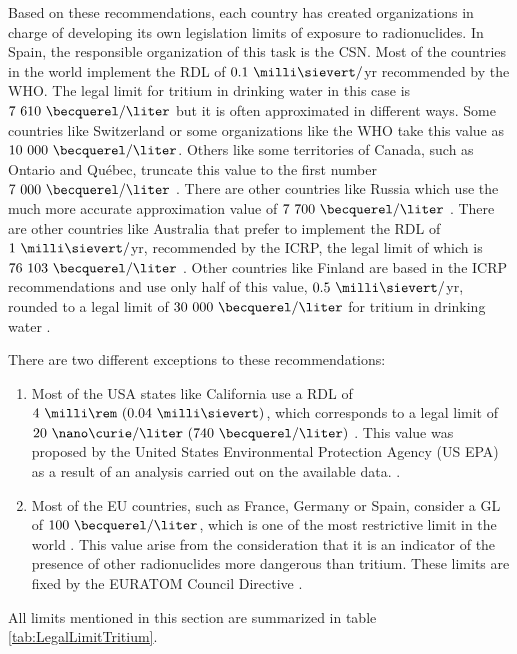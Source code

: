 Based on these recommendations, each country has created organizations in charge of developing its own legislation limits of exposure to radionuclides. In Spain, the responsible organization of this task is the CSN. Most of the countries in the world implement the RDL of $0.1~\milli\sievert/$yr recommended by the WHO. The legal limit for tritium in drinking water in this case is $7~610~\becquerel/\liter$  but it is often approximated in different ways. Some countries like Switzerland \cite{Switzerland_GL} or some organizations like the WHO \cite{WHO_GL} take this value as $10~000~\becquerel/\liter$. Others like some territories of Canada, such as Ontario and Québec, truncate this value to the first number $7~000~\becquerel/\liter$ \cite{Ontario_GL, Quebec_GL}. There are other countries like Russia which use the much more accurate approximation value of $7~700~\becquerel/\liter$ \cite{Russia_GL}. There are other countries like Australia that prefer to implement the RDL of $1~\milli\sievert/$yr, recommended by the ICRP, the legal limit of which is $76~103~\becquerel/\liter$ \cite{Australia_GL}. Other countries like Finland are based in the ICRP recommendations and use only half of this value, $0.5~\milli\sievert/$yr, rounded to a legal limit of $30~000~\becquerel/\liter$ for tritium in drinking water \cite{Finland_GL}.

There are two different exceptions to these recommendations:
\begin{enumerate}
\item{} Most of the USA states like California use a RDL of $4~\milli\rem~(0.04~\milli\sievert)$, which corresponds to a legal limit of $20~\nano\curie/\liter~(740~\becquerel/\liter)$ \cite{California_GL}. This value was proposed by the United States Environmental Protection Agency (US EPA) as a result of an analysis carried out on the available data. \cite{USEPA_GL}.

\item{} Most of the EU countries, such as France, Germany or Spain, consider a GL of $100~\becquerel/\liter$, which is one of the most restrictive limit in the world \cite{France_GL, Germany_GL, Spain_GL}. This value arise from the consideration that it is an indicator of the presence of other radionuclides more dangerous than tritium. These limits are fixed by the EURATOM Council Directive \cite{EURATOM_GL}. 
\end{enumerate}

All limits mentioned in this section are summarized in table \ref{tab:LegalLimitTritium}.


